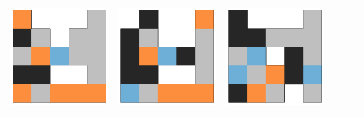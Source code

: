 \begin{tabular}{cccccc}
    \rule{0pt}{9ex}  
    \includegraphics[scale=0.1]{images/top_designs/carrier/ga/exp1/gen29_ind0} &
    \includegraphics[scale=0.1]{images/top_designs/carrier/ga/exp1/gen29_ind1} &
    \includegraphics[scale=0.1]{images/top_designs/carrier/ga/exp1/gen29_ind2} &

\end{tabular}
